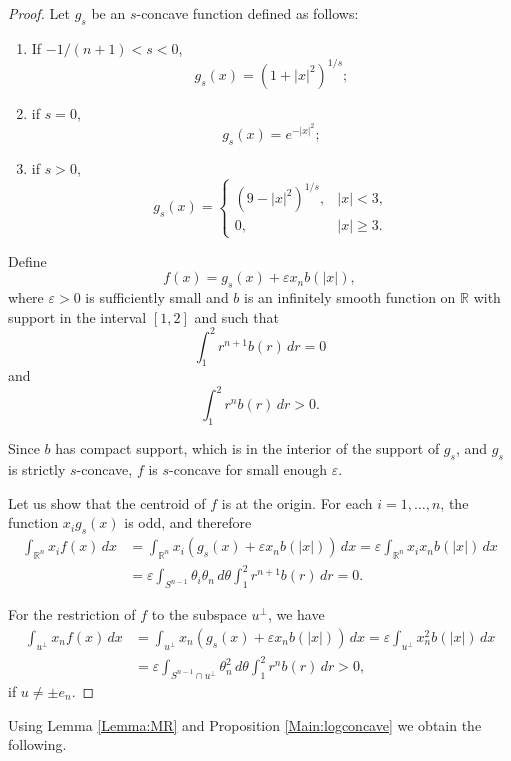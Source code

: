 \documentclass[12pt,letterpaper,reqno]{amsart}
\theoremstyle{definition}
\begin{document}
				\begin{proof}
					Let $g_s$ be an $s$-concave function defined as follows:
					\begin{enumerate} \item If $-1/(n+1)<s<0$, $$g_s(x) = (1+|x|^2)^{1/s};$$ \item if $s=0$,
					 $$g_s(x)= e^{-|x|^2};$$
					 \item if $s>0$, $$g_s(x) =\begin{cases}
					(9-|x|^2)^{1/s}	, & |x|<3,\\
					0, & |x|\ge 3.						
						\end{cases}$$
						\end{enumerate}
					
					
					Define $$f(x) = g_s(x) + \varepsilon x_n b(|x|),$$
					where $\varepsilon>0$ is sufficiently small and $b$ is an infinitely smooth function on $\mathbb R$ with support in the interval $[1,2]$ and such that
					  $$\int_1^2 r^{n+1} b(r)\, dr = 0$$ and $$\int_1^2 r^{n} b(r)\, dr > 0.$$
					  
					  
					  Since $b$ has compact support, which is in the interior of the support of $g_s$,   and $g_s$ is strictly $s$-concave, $f$ is $s$-concave for small enough $\varepsilon$.
					  
					  Let us show that the centroid of $f$ is at the origin. For each $i=1,\ldots, n$, the function $x_i g_s(x)$ is odd, and therefore
					  \begin{align*}\int_{\mathbb R^n} x_i f(x)\, dx&= \int_{\mathbb R^n} x_i \left(  g_s(x) + \varepsilon x_n b(|x|) \right)\, dx= \varepsilon \int_{\mathbb R^n} x_i    x_n b(|x|) \, dx\\
					  	&= \varepsilon \int_{S^{n-1} } \theta_i    \theta_n\, d\theta \int_1^2 r^{n+1} b(r) \, dr=0.					  	
					  	\end{align*}
					  	
					  	
					  	For the restriction of $f$ to the subspace $u^\perp$, we have		  	
					  		  \begin{align*}\int_{u^\perp} x_n f(x)\, dx&= \int_{u^\perp} x_n \left(  g_s(x) + \varepsilon x_n b(|x|) \right)\, dx= \varepsilon \int_{u^\perp}     x_n^2 b(|x|) \, dx\\
					  		&= \varepsilon \int_{S^{n-1}\cap u^\perp }    \theta_n^2 \, d\theta \int_1^2 r^{n} b(r) \, dr>0,					  		
					  	\end{align*}
					  	if $u\ne \pm e_n$. 
					  
					\end{proof}
		Using 	Lemma \ref{Lemma:MR} and Proposition	\ref{Main:logconcave} we obtain the following.
				
\end{document}
